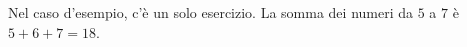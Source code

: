 
\Examples

\begin{example}
\end{example}


\Explanation

Nel caso d'esempio, c'è un solo esercizio. La somma dei numeri da $5$ a $7$ è $5+6+7 = 18$.
